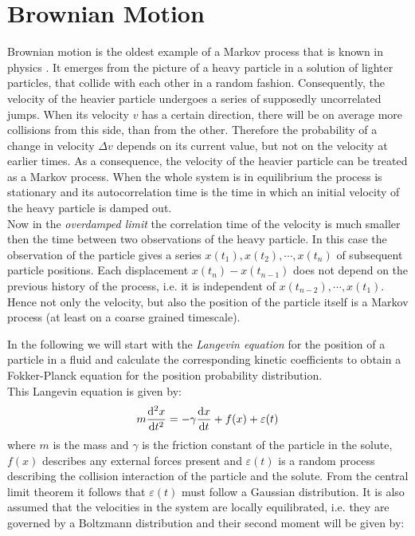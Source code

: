 \section{Brownian Motion}
\label{Brownian_Motion}
Brownian motion is the oldest example of a Markov process that is known in physics \cite{Einstein1905,Smoluchowski1906}. It emerges from the picture of a heavy particle in a solution of lighter particles, that collide with each other in a random fashion. Consequently, the velocity of the heavier particle undergoes a series of supposedly uncorrelated jumps. When its velocity $v$ has a certain direction, there will be on average more collisions from this side, than from the other. Therefore the probability of a change in velocity $\Delta v$ depends on its current value, but not on the velocity at earlier times. As a consequence, the velocity of the heavier particle can be treated as a Markov process. When the whole system is in equilibrium the process is stationary and its autocorrelation time is the time in which an initial velocity of the heavy particle is damped out. \\
Now in the \textit{overdamped limit} the correlation time of the velocity is much smaller then the time between two observations of the heavy particle. In this case the observation of the particle gives a series $x(t_1), x(t_2), \cdots , x(t_n)$ of subsequent particle positions. Each displacement $x(t_{n}) - x(t_{n-1})$ does not depend on the previous history of the process, i.e. it is independent of $x(t_{n-2}), \cdots , x(t_{1})$. Hence not only the velocity, but also the position of the particle itself is a Markov process (at least on a coarse grained timescale). 
\par
In the following we will start with the \emph{Langevin equation} \cite{Langevin1908} for the position of a particle in a fluid and calculate the corresponding kinetic coefficients to obtain a Fokker-Planck equation for the position probability distribution.\\ 
This Langevin equation is given by:
\begin{equation}
    m \frac{{\rm d}^2 x}{{\rm d}t^2} = -\gamma \frac{ {\rm d}x}{{\rm d}t} + f(x) + \varepsilon(t)
    \label{Langewin equation}
\end{equation}
where $m$ is the mass and $\gamma$ is the friction constant of the particle in the solute, $f(x)$ describes any external forces present and $\varepsilon(t)$ is a random process describing the collision interaction of the particle and the solute. From the central limit theorem it follows that $\varepsilon(t)$ must follow a Gaussian distribution. It is also assumed that the velocities in the system are locally equilibrated, i.e. they are governed by a Boltzmann distribution and their second moment will be given by:
